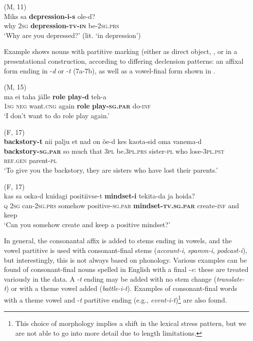 \documentclass[output=paper]{langscibook}
\begin{document}
\ex  (M, 11)\\ \label{ex:vihmanetal:6b}
\gll Miks  sa  \textbf{{depression-i-s}}    ole-d?\\
why  2\textsc{sg}  \textbf{depression-\textsc{tv-in}}  be-2\textsc{sg.prs}\\
\glt ‘Why are you depressed?’ (lit. ‘in depression’)
    \z
\z



Example  shows nouns with partitive marking (either as direct object, , or in a presentational construction,  according to differing declension patterns: an affixal form ending in -\textit{d} or -\textit{t} (7a-7b), as well as a vowel-final form shown in .

\ea%
    \label{ex:vihmanetal:7}
\ea  (M, 15)\\ \label{ex:vihmanetal:7a}
\gll ma  ei  taha    jälle  \textbf{role} \textbf{play-d}   teh-a\\
1\textsc{sg}   \textsc{neg}   want.\textsc{cng}  again  \textbf{role} \textbf{play{}-}\textbf{\textsc{sg.par}} do{}-\textsc{inf}\\
\glt ‘I don’t want to do role play again.’

\ex  (F, 17)\\ \label{ex:vihmanetal:7b}
\gll \textbf{{backstory-t}}    nii palju et   nad   on õe-d     kes   kaota-sid   oma     vanema-d\\
\textbf{backstory\textsc{{}-sg.par}}   so much that   3\textsc{pl}   be.3\textsc{pl.prs} sister{}-\textsc{pl}  who   lose{}-3\textsc{pl.pst}   \textsc{ref.gen}   parent-\textsc{pl}\\
\glt ‘To give you the backstory, they are sisters who have lost their parents.’

\ex  (F, 17)\\ \label{ex:vihmanetal:7c}
\gll kas   sa   oska-d     kuidagi   positiivse-t \textbf{mindset-i} tekita-da   ja   hoida?\\
\textsc{q}   2\textsc{sg}  can{}-2\textsc{sg.prs}   somehow   positive{}-\textsc{sg.par} \textbf{mindset-\textsc{tv.sg.par}}   create{}-\textsc{inf}   and   keep\\
\glt ‘Can you somehow create and keep a positive mindset?’
    \z
\z



In general, the consonantal affix is added to stems ending in vowels, and the vowel partitive is used with consonant-final stems (\textit{account-i}, \textit{spamm-i}, \textit{podcast-i}), but interestingly, this is not always based on phonology. Various examples can be found of consonant-final nouns spelled in English with a final -\textit{e}: these are treated variously in the data. A -\textit{t} ending may be added with no stem change (\textit{translate-t}) or with a theme vowel added (\textit{battle-i-t}). Examples of consonant-final words with a theme vowel and -\textit{t} partitive ending (e.g., \textit{event-i-t})\footnote{This choice of morphology implies a shift in the lexical stress pattern, but we are not able to go into more detail due to length limitations.} are also found.
\end{document}
